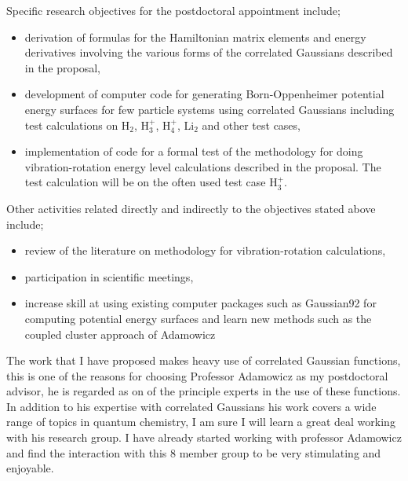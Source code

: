 \documentclass[12pt,thmsa]{article}
\begin{document}
Specific research objectives for the postdoctoral appointment include;

\begin{itemize}
\item  derivation of formulas for the Hamiltonian matrix elements and energy
derivatives involving the various forms of the correlated Gaussians
described in the proposal,

\item  development of computer code for generating Born-Oppenheimer
potential energy surfaces for few particle systems using correlated
Gaussians including test calculations on H$_2$, H$_3^{+}$, H$_4^{+}$, Li$_2$
and other test cases,

\item  implementation of code for a formal test of the methodology for doing
vibration-rotation energy level calculations described in the proposal. The
test calculation will be on the often used test case H$_3^{+}$. 
\end{itemize}

Other activities related directly and indirectly to the objectives stated
above include;

\begin{itemize}
\item  review of the literature on methodology for vibration-rotation
calculations,

\item  participation in scientific meetings,

\item  increase skill at using existing computer packages such as Gaussian92
for computing potential energy surfaces and learn new methods such as the
coupled cluster approach of Adamowicz
\end{itemize}

The work that I have proposed makes heavy use of correlated Gaussian
functions, this is one of the reasons for choosing Professor Adamowicz as my
postdoctoral advisor, he is regarded as on of the principle experts in the
use of these functions. In addition to his expertise with correlated
Gaussians his work covers a wide range of topics in quantum chemistry, I am
sure I will learn a great deal working with his research group. I have
already started working with professor Adamowicz and find the interaction
with this 8 member group to be very stimulating and enjoyable.   
\end{document}
